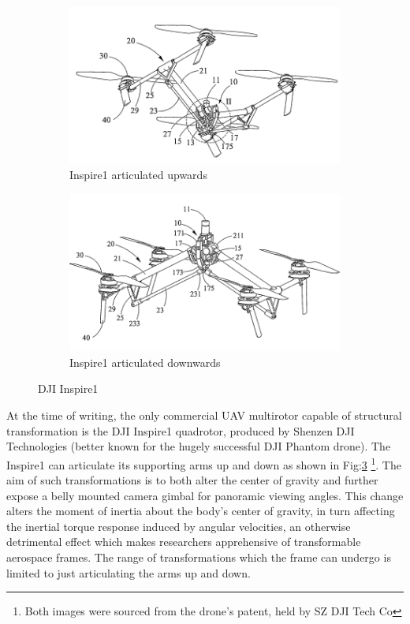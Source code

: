\begin{figure}[hbtp]
\centering
\begin{subfigure}{.5\textwidth}
\centering
\includegraphics[width=\textwidth]{figs/dji-inspire1}
\caption{Inspire1 articulated upwards}
\label{fig:inspireup}
\end{subfigure}%
\begin{subfigure}{.5\textwidth}
\centering
\includegraphics[width=\textwidth]{figs/dji-inspire2}
\caption{Inspire1 articulated downwards}
\label{fig:inspiredown}
\end{subfigure}
\caption{DJI Inspire1}
\label{fig:inspire1}
\end{figure}
At the time of writing, the only commercial UAV multirotor capable of structural transformation is the DJI Inspire1 quadrotor\cite{inspire}, produced by Shenzen DJI Technologies (better known for the hugely successful DJI Phantom drone\cite{phantom}). The Inspire1 can articulate its supporting arms up and down as shown in Fig:\ref{fig:inspire1} \footnote{Both images were sourced from the drone's patent, held by SZ DJI Tech Co\cite{djinspire}}. The aim of such transformations is to both alter the center of gravity and further expose a belly mounted camera gimbal for panoramic viewing angles. This change alters the moment of inertia about the body's center of gravity, in turn affecting the inertial torque response induced by angular velocities, an otherwise detrimental effect which makes researchers apprehensive of transformable aerospace frames. The range of transformations which the frame can undergo is limited to just articulating the arms up and down.
